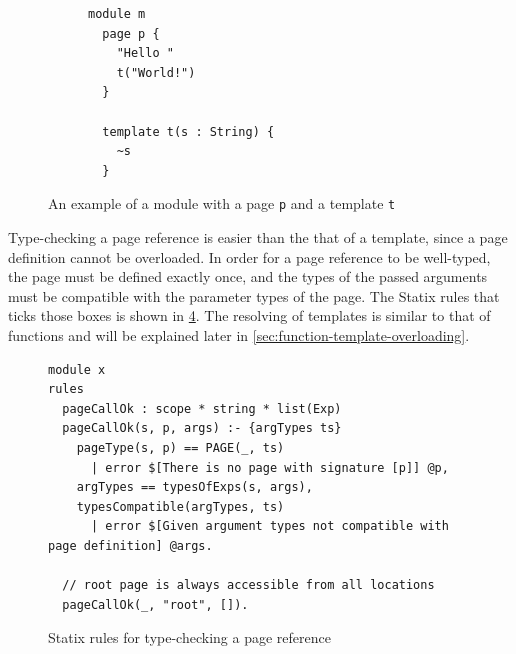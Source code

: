       \begin{figure}
        \begin{subfigure}[b]{0.3\textwidth}
          \begin{verbatim}
module m
  page p {
    "Hello "
    t("World!")
  }

  template t(s : String) {
    ~s
  }
          \end{verbatim}
          \caption{\label{fig:webdsl-page-and-template-decl-webdsl}}
        \end{subfigure}
        \begin{subfigure}[b]{0.7\textwidth}
          \centering
          \caption{\label{fig:webdsl-page-and-template-decl-sg}}
        \end{subfigure}
        \caption{\label{fig:webdsl-page-and-template-decl}An example of a module with a page \texttt{p} and a template \texttt{t}}
      \end{figure}

      Type-checking a page reference is easier than the that of a template, since a page definition cannot be overloaded. In order for a page reference to be well-typed, the page must be defined exactly once, and the types of the passed arguments must be compatible with the parameter types of the page. The Statix rules that ticks those boxes is shown in \cref{fig:webdsl-page-type-checking}. The resolving of templates is similar to that of functions and will be explained later in \cref{sec:function-template-overloading}.

      \begin{figure}
        \begin{verbatim}
module x
rules
  pageCallOk : scope * string * list(Exp)
  pageCallOk(s, p, args) :- {argTypes ts}
    pageType(s, p) == PAGE(_, ts)
      | error $[There is no page with signature [p]] @p,
    argTypes == typesOfExps(s, args),
    typesCompatible(argTypes, ts)
      | error $[Given argument types not compatible with page definition] @args.
    
  // root page is always accessible from all locations
  pageCallOk(_, "root", []).
        \end{verbatim}
        \caption{\label{fig:webdsl-page-type-checking}Statix rules for type-checking a page reference}
      \end{figure}

